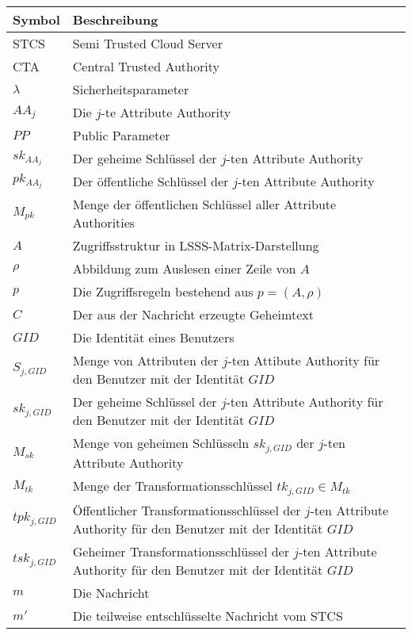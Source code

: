\begin{center}
\begin{small}
	\begin{tabular}{p{3cm}p{9cm}}
		\hline
		Symbol & Beschreibung \\
		\hline
		STCS & Semi Trusted Cloud Server \\
		CTA & Central Trusted Authority \\
		$\lambda$ & Sicherheitsparameter \\
		$AA_j$ & Die $j$-te Attribute Authority \\
		$PP$ & Public Parameter \\
		$sk_{AA_j}$ & Der geheime Schlüssel der $j$-ten Attribute Authority \\
		$pk_{AA_j}$ & Der öffentliche Schlüssel der $j$-ten Attribute Authority \\
		$M_{pk}$ & Menge der öffentlichen Schlüssel aller Attribute Authorities \\
		$A$ & Zugriffsstruktur in LSSS-Matrix-Darstellung \\
		$\rho$ & Abbildung zum Auslesen einer Zeile von $A$ \\
		$p$ & Die Zugriffsregeln bestehend aus $p = \left(A, \rho\right)$ \\
		$C$ & Der aus der Nachricht erzeugte Geheimtext \\
		$GID$ & Die Identität eines Benutzers \\
		$S_{j, GID}$ & Menge von Attributen der $j$-ten Attibute Authority für den
		Benutzer mit der Identität $GID$ \\
		$sk_{j, GID}$ & Der geheime Schlüssel der $j$-ten Attribute Authority für
		den Benutzer mit der Identität $GID$ \\
		$M_{sk}$ & Menge von geheimen Schlüsseln $sk_{j, GID}$ der $j$-ten Attribute Authority \\
		$M_{tk}$ & Menge der Transformationsschlüssel $tk_{j, GID} \in M_{tk}$ \\
		$tpk_{j, GID}$ & Öffentlicher Transformationsschlüssel der $j$-ten
		Attribute Authority für den Benutzer mit der Identität $GID$ \\
		$tsk_{j, GID}$ & Geheimer Transformationsschlüssel der $j$-ten
		Attribute Authority für den Benutzer mit der Identität $GID$ \\
		$m$ & Die Nachricht \\
		$m'$ & Die teilweise entschlüsselte Nachricht vom STCS \\
		\hline
	\end{tabular}
\end{small}
\end{center}

